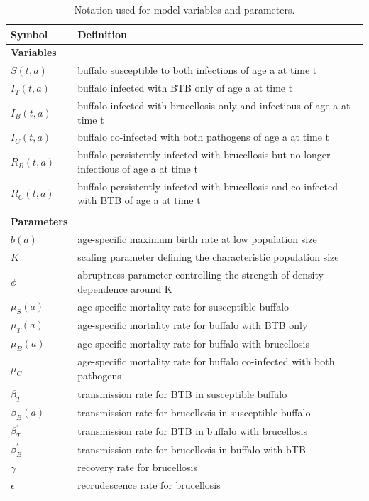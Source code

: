 \documentclass{article}
\begin{document}
\begin{table} %
\label {Table S3.1.}
\caption{Notation used for model variables and parameters.}
\newcommand{\head}[1]{\textnormal{\textbf{#1}}}
\small
\begin{tabular}{ll} %
\hline
\head{Symbol} & \head{Definition}\\
\hline
\textbf{Variables} &   \\
$S(t, a)$ & buffalo susceptible to both infections of age a at time t  \\
$I_T(t, a)$ & buffalo infected with BTB only of age a at time t  \\
$I_B(t, a)$ & buffalo infected with brucellosis only and infectious of age a at time t \\
$I_C(t, a)$ & buffalo co-infected with both pathogens of age a at time t  \\
$R_B(t, a)$ & buffalo persistently infected with brucellosis but no longer infectious of age a at time t  \\
$R_C(t, a)$ & buffalo persistently infected with brucellosis and co-infected with BTB of age a at time t \\
& \\
\textbf{Parameters} &   \\
$b(a)$ & age-specific maximum birth rate at low population size\\
$K $& scaling parameter defining the characteristic population size \\
$\phi $& abruptness parameter controlling the strength of density dependence around K \\ 
$\mu_S(a) $& age-specific mortality rate for susceptible buffalo \\ 
$\mu_T(a) $& age-specific mortality rate for buffalo with BTB only \\ 
$\mu_B(a) $& age-specific mortality rate for buffalo with brucellosis \\ 
$\mu_C$ &age-specific mortality rate for buffalo co-infected with both pathogens \\ 
$\beta_T $ & transmission rate for BTB in susceptible buffalo \\
$\beta_B(a)$ & transmission rate for brucellosis in susceptible buffalo \\
$\beta_{T}^{'}$  & transmission rate for BTB in buffalo with brucellosis \\
$\beta_{B}^{'}$  & transmission rate for brucellosis in buffalo with bTB \\
$\gamma$& recovery rate for brucellosis \\
$\epsilon$& recrudescence rate for brucellosis \\
\hline 
\end{tabular}
\end{table}
\end{document}
